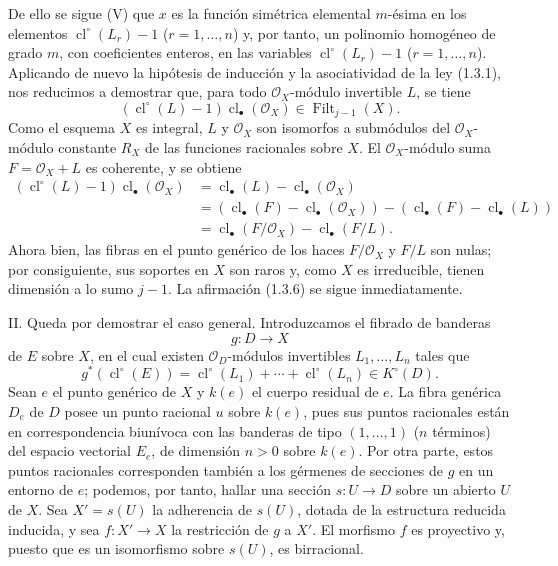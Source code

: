 \documentclass[11pt]{article}
\providecommand{\Filt}{\operatorname{Filt}}
\providecommand{\cl}{\operatorname{cl}}
\begin{document}
De ello se sigue (V) que $x$ es la función simétrica elemental $m$-ésima en
los elementos $\cl^\circ(L_r)-1$ ($r=1,\ldots,n$) y, por tanto, un polinomio
homogéneo de grado $m$, con coeficientes enteros, en las variables
$\cl^\circ(L_r)-1$ ($r=1,\ldots,n$). Aplicando de nuevo la hipótesis de
inducción y la asociatividad de la ley (1.3.1), nos reducimos a demostrar que,
para todo $\mathcal O_X$-módulo invertible $L$, se tiene
\begin{equation}\tag{1.3.6}
(\cl^\circ(L)-1)\cl_\bullet(\mathcal O_X)\in\Filt_{j-1}(X).
\end{equation}
Como el esquema $X$ es integral, $L$ y $\mathcal O_X$ son isomorfos a
submódulos del $\mathcal O_X$-módulo constante $R_X$ de las funciones
racionales sobre $X$. El $\mathcal O_X$-módulo suma
$F=\mathcal O_X+L$ es coherente, y se obtiene
\begin{align*}
(\cl^\circ(L)-1)\cl_\bullet(\mathcal O_X)
&=\cl_\bullet(L)-\cl_\bullet(\mathcal O_X)\\
&=(\cl_\bullet(F)-\cl_\bullet(\mathcal O_X))
  -(\cl_\bullet(F)-\cl_\bullet(L))\\
&=\cl_\bullet(F/\mathcal O_X)-\cl_\bullet(F/L).
\end{align*}
Ahora bien, las fibras en el punto genérico de los haces
$F/\mathcal O_X$ y $F/L$ son nulas; por consiguiente, sus soportes en $X$
son raros y, como $X$ es irreducible, tienen dimensión a lo sumo $j-1$.
La afirmación (1.3.6) se sigue inmediatamente.

II. Queda por demostrar el caso general. Introduzcamos el fibrado de banderas
\[
g:D\longrightarrow X
\]
de $E$ sobre $X$, en el cual existen $\mathcal O_D$-módulos invertibles
$L_1,\ldots,L_n$ tales que
\begin{equation}\tag{1.3.7}
g^*(\cl^\circ(E))
=\cl^\circ(L_1)+\cdots+\cl^\circ(L_n)\in K^\circ(D).
\end{equation}
Sean $e$ el punto genérico de $X$ y $k(e)$ el cuerpo residual de $e$.
La fibra genérica $D_e$ de $D$ posee un punto racional $u$ sobre $k(e)$,
pues sus puntos racionales están en correspondencia biunívoca con las
banderas de tipo $(1,\ldots,1)$ ($n$ términos) del espacio vectorial $E_e$,
de dimensión $n>0$ sobre $k(e)$. Por otra parte, estos puntos racionales
corresponden también a los gérmenes de secciones de $g$ en un entorno de
$e$; podemos, por tanto, hallar una sección $s:U\to D$ sobre un abierto
$U$ de $X$. Sea $X'=s(U)$ la adherencia de $s(U)$, dotada de la estructura
reducida inducida, y sea $f:X'\to X$ la restricción de $g$ a $X'$. El
morfismo $f$ es proyectivo y, puesto que es un isomorfismo sobre $s(U)$,
es birracional.
\end{document}
